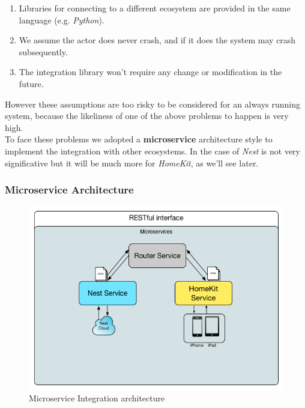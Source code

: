 \begin{enumerate}
    \item Libraries for connecting to a different ecosystem are provided in the same language (e.g. \textit{Python}).
    \item We assume the actor does never crash, and if it does the system may crash subsequently.
    \item The integration library won't require any change or modification in the future.
\end{enumerate}

However these assumptions are too risky to be considered for an always running system, because the likeliness
of one of the above problems to happen is very high.\\
To face these problems we adopted a \textbf{microservice} architecture style to implement the integration with
other ecosystems. In the case of \textit{Nest} is not very significative but it will be much more for \textit{HomeKit}, as
we'll see later.

\subsubsection{Microservice Architecture}


\begin{figure}[h]
\caption{Microservice Integration architecture}
\label{fig:test-arch}
\centering
\includegraphics[scale=0.65]{test-arch.png}
\end{figure}

